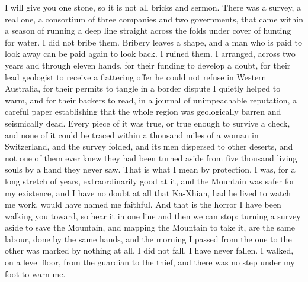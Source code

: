 I will give you one stone, so it is not all bricks and sermon. There was a survey, a real one, a consortium of three companies and two governments, that came within a season of running a deep line straight across the folds under cover of hunting for water. I did not bribe them. Bribery leaves a shape, and a man who is paid to look away can be paid again to look back. I ruined them. I arranged, across two years and through eleven hands, for their funding to develop a doubt, for their lead geologist to receive a flattering offer he could not refuse in Western Australia, for their permits to tangle in a border dispute I quietly helped to warm, and for their backers to read, in a journal of unimpeachable reputation, a careful paper establishing that the whole region was geologically barren and seismically dead. Every piece of it was true, or true enough to survive a check, and none of it could be traced within a thousand miles of a woman in Switzerland, and the survey folded, and its men dispersed to other deserts, and not one of them ever knew they had been turned aside from five thousand living souls by a hand they never saw. That is what I mean by protection. I was, for a long stretch of years, extraordinarily good at it, and the Mountain was safer for my existence, and I have no doubt at all that Ka-Xhian, had he lived to watch me work, would have named me faithful. And that is the horror I have been walking you toward, so hear it in one line and then we can stop: turning a survey aside to save the Mountain, and mapping the Mountain to take it, are the same labour, done by the same hands, and the morning I passed from the one to the other was marked by nothing at all. I did not fall. I have never fallen. I walked, on a level floor, from the guardian to the thief, and there was no step under my foot to warn me.\par

